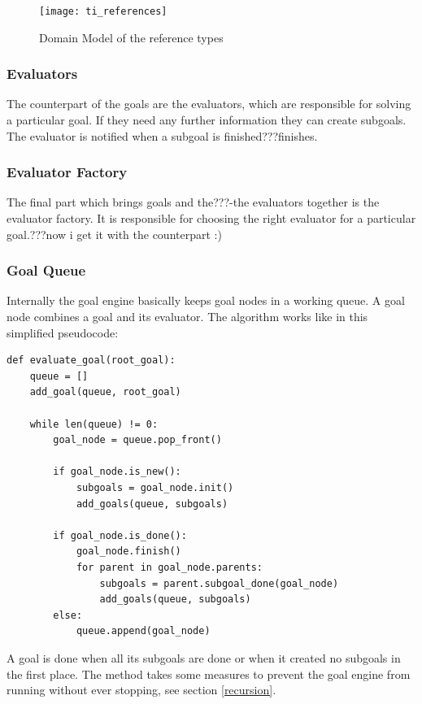 \documentclass[12pt,halfparskip,DIV11,BCOR10mm]{scrreprt}
\begin{document}
\begin{figure}[H]
    \centering
    \texttt{[image: ti\_references]}
    \caption{Domain Model of the reference types}
    \label{fig:ti_referenes}
\end{figure}


\subsubsection{Evaluators}

The counterpart of the goals are the evaluators, which are responsible for solving a particular goal. If they need any further information they can create subgoals. The evaluator is notified when a subgoal is finished???finishes. 

\subsubsection{Evaluator Factory}

The final part which brings goals and the???-the evaluators together is the evaluator factory. It is responsible for choosing the right evaluator for a particular goal.???now i get it with the counterpart :)

\subsubsection{Goal Queue}

Internally the goal engine basically keeps goal nodes in a working queue. A goal node combines a goal and its evaluator. The algorithm works like in this simplified pseudocode:

\begin{lstlisting}
def evaluate_goal(root_goal):
    queue = []
    add_goal(queue, root_goal)

    while len(queue) != 0:
        goal_node = queue.pop_front()

        if goal_node.is_new():
            subgoals = goal_node.init()
            add_goals(queue, subgoals)

        if goal_node.is_done():
            goal_node.finish()
            for parent in goal_node.parents:
                subgoals = parent.subgoal_done(goal_node)
                add_goals(queue, subgoals)
        else:
            queue.append(goal_node)
\end{lstlisting}

A goal is done when all its subgoals are done or when it created no subgoals in the first place. The  method takes some measures to prevent the goal engine from running without ever stopping, see section \vref{recursion}.
\end{document}
